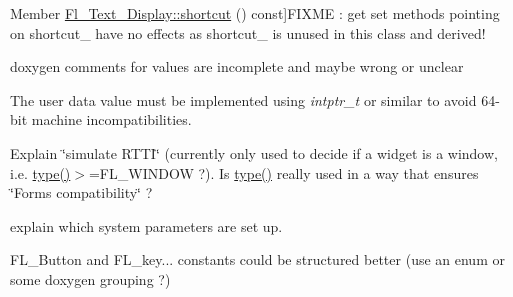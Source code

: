 \begin{DoxyRefList}
Member \hyperlink{class_fl___text___display_a98f01dd6b8be0522e54bccf0f3587d47}{Fl\+\_\+\+Text\+\_\+\+Display\+:\+:shortcut} () const]F\+I\+X\+ME \+: get set methods pointing on shortcut\+\_\+ have no effects as shortcut\+\_\+ is unused in this class and derived!  
\item[\label{todo__todo000001}%
\Hypertarget{todo__todo000001}%
Member \hyperlink{_enumerations_8_h_adaaa8b52b78abf3ccce4787b112e6665}{Fl\+\_\+\+When} ]doxygen comments for values are incomplete and maybe wrong or unclear  
\item[\label{todo__todo000023}%
\Hypertarget{todo__todo000023}%
Member \hyperlink{class_fl___widget_a3eb3b128cbad3f579a66cab813470442}{Fl\+\_\+\+Widget\+:\+:argument} (long v)]The user data value must be implemented using {\itshape intptr\+\_\+t} or similar to avoid 64-\/bit machine incompatibilities.  
\item[\label{todo__todo000022}%
\Hypertarget{todo__todo000022}%
Member \hyperlink{class_fl___widget_adda2e8f162b3ea0332eb8d762350bbd5}{Fl\+\_\+\+Widget\+:\+:type} () const]Explain \char`\"{}simulate R\+T\+T\+I\char`\"{} (currently only used to decide if a widget is a window, i.\+e. \hyperlink{class_fl___widget_adda2e8f162b3ea0332eb8d762350bbd5}{type()}$>$=F\+L\+\_\+\+W\+I\+N\+D\+OW ?). Is \hyperlink{class_fl___widget_adda2e8f162b3ea0332eb8d762350bbd5}{type()} really used in a way that ensures \char`\"{}\+Forms compatibility\char`\"{} ?  
\item[\label{todo__todo000024}%
\Hypertarget{todo__todo000024}%
Member \hyperlink{class_fl___window_a0d75dfcdc8fb797f9247482da1e0152b}{Fl\+\_\+\+Window\+:\+:show} (int argc, char $\ast$$\ast$argv)]explain which system parameters are set up. 
\item[\label{todo__todo000002}%
\Hypertarget{todo__todo000002}%
Module \hyperlink{_enumerations_8_h_amgrp010740e6371ef70b76e732e3526cbcdc}{Mouse and Keyboard Events} ]F\+L\+\_\+\+Button and F\+L\+\_\+key... constants could be structured better (use an enum or some doxygen grouping ?)
\end{DoxyRefList}